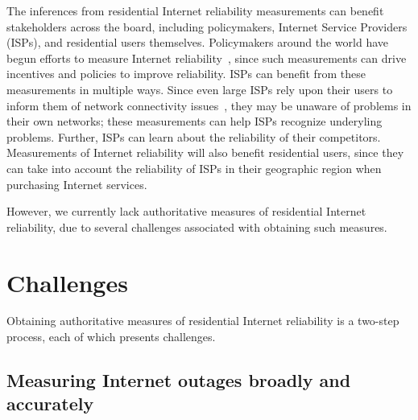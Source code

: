  
The inferences from residential Internet reliability measurements can
benefit stakeholders across the board, including policymakers,
Internet Service Providers (ISPs), and residential users
themselves. Policymakers around the world have begun efforts to
measure Internet reliability~\cite{measuring-broadband-america,
measuring-broadband-canda, ofcom-uk-broadband-research,
measuring-broadband-australia}, since such measurements can drive
incentives and policies to improve reliability. ISPs can benefit from
these measurements in multiple ways. Since even large ISPs rely upon
their users to inform them of network connectivity
issues~\cite{conext10-jin}, they may be unaware of problems in their
own networks; these measurements can help ISPs recognize underyling
problems. Further, ISPs can learn about the reliability of their
competitors. Measurements of Internet reliability will also benefit
residential users, since they can take into account the reliability of
ISPs in their geographic region when purchasing Internet services.

However, we currently lack authoritative measures of residential
Internet reliability, due to several challenges associated with
obtaining such measures. 



\section{Challenges}

Obtaining authoritative measures of residential Internet reliability
is a two-step process, each of which presents challenges. 

\subsection{Measuring Internet outages broadly and accurately}

